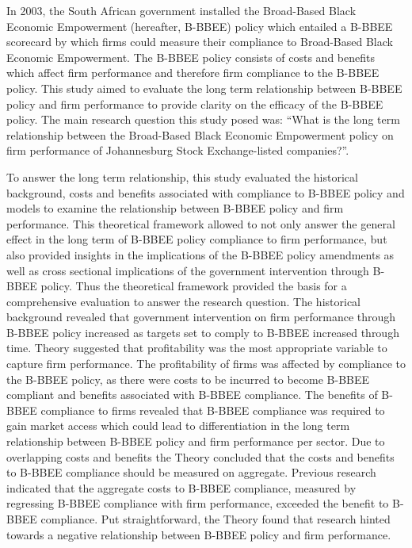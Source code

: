 In 2003, the South African government installed the Broad-Based Black Economic Empowerment (hereafter, B-BBEE) policy which entailed a B-BBEE scorecard by which firms could measure their compliance to Broad-Based Black Economic Empowerment. The B-BBEE policy consists of costs and benefits which affect firm performance and therefore firm compliance to the B-BBEE policy. This study aimed to evaluate the long term relationship between B-BBEE policy and firm performance to provide clarity on the efficacy of the B-BBEE policy. The main research question this study posed was: “What is the long term relationship between the Broad-Based Black Economic Empowerment policy on firm performance of Johannesburg Stock Exchange-listed companies?”. 

To answer the long term relationship, this study evaluated the historical background, costs and benefits associated with compliance to B-BBEE policy and models to examine the relationship between B-BBEE policy and firm performance. This theoretical framework allowed to not only answer the general effect in the long term of B-BBEE policy compliance to firm performance, but also provided insights in the implications of the B-BBEE policy amendments as well as cross sectional implications of the government intervention through B-BBEE policy. Thus the theoretical framework provided the basis for a comprehensive evaluation to answer the research question. The historical background revealed that government intervention on firm performance through B-BBEE policy increased as targets set to comply to B-BBEE increased through time. Theory suggested that profitability was the most appropriate variable to capture firm performance. The profitability of firms was affected by compliance to the B-BBEE policy, as there were costs to be incurred to become B-BBEE compliant and benefits associated with B-BBEE compliance. The benefits of B-BBEE compliance to firms revealed that B-BBEE compliance was required to gain market access which could lead to differentiation in the long term relationship between B-BBEE policy and firm performance per sector. Due to overlapping costs and benefits the Theory concluded that the costs and benefits to B-BBEE compliance should be measured on aggregate. Previous research indicated that the aggregate costs to B-BBEE compliance, measured by regressing B-BBEE compliance with firm performance, exceeded the benefit to B-BBEE compliance. Put straightforward, the Theory found that research hinted towards a negative relationship between B-BBEE policy and firm performance.

